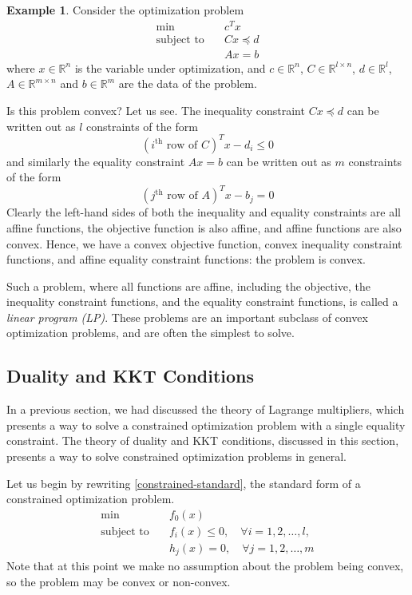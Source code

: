 \documentclass[a4paper]{article}
\theoremstyle{definition}
\newtheorem{example}{Example}[section]
\begin{document}
\begin{example}
	\label{linear-program-example}
	Consider the optimization problem
	\begin{align*}
		\min \quad & c^T x \\
		\text{subject to} \quad & Cx \preceq d \\
		& Ax = b
	\end{align*}
	where $x \in \mathbb{R}^n$ is the variable under optimization, and $c \in \mathbb{R}^n$, $C \in \mathbb{R}^{l \times n}$, $d \in \mathbb{R}^l$, $A \in \mathbb{R}^{m \times n}$ and $b \in \mathbb{R}^m$ are the data of the problem.

	Is this problem convex?
	Let us see.
	The inequality constraint $Cx \preceq d$ can be written out as $l$ constraints of the form
	\begin{equation*}
		(i^\text{th} \text{ row of } C)^T x - d_i \leq 0
	\end{equation*}
	and similarly the equality constraint $Ax = b$ can be written out as $m$ constraints of the form
	\begin{equation*}
		(j^\text{th} \text{ row of } A)^T x - b_j = 0
	\end{equation*}
	Clearly the left-hand sides of both the inequality and equality constraints are all affine functions, the objective function is also affine, and affine functions are also convex.
	Hence, we have a convex objective function, convex inequality constraint functions, and affine equality constraint functions: the problem is convex.

	Such a problem, where all functions are affine, including the objective, the inequality constraint functions, and the equality constraint functions, is called a \textit{linear program (LP)}.
	These problems are an important subclass of convex optimization problems, and are often the simplest to solve.
\end{example}

\subsection{Duality and KKT Conditions}

In a previous section, we had discussed the theory of Lagrange multipliers, which presents a way to solve a constrained optimization problem with a single equality constraint.
The theory of duality and KKT conditions, discussed in this section, presents a way to solve constrained optimization problems in general.

Let us begin by rewriting \eqref{constrained-standard}, the standard form of a constrained optimization problem.
\begin{align*}
	\min \quad & f_0(x) \\
	\text{subject to} \quad & f_i(x) \leq 0, \quad \forall i = 1, 2, \dots, l, \\
	& h_j(x) = 0, \quad \forall j = 1, 2, \dots, m
\end{align*}
Note that at this point we make no assumption about the problem being convex, so the problem may be convex or non-convex.
\end{document}
